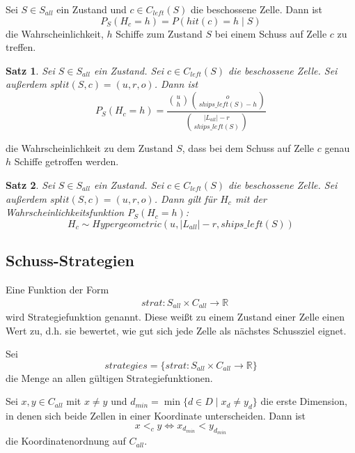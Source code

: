 \documentclass[a4paper,12pt]{llncs}
\numberwithin{equation}{section}
\newtheorem{satz}{Satz}
\begin{document}
\begin{definition}
Sei $S\in S_{all}$ ein Zustand und $c \in C_{left}(S)$ die beschossene Zelle.
Dann ist
\[
P_S(H_{c}=h)=P(hit(c)=h \mid S) 
\]
die Wahrscheinlichkeit, $h$ Schiffe zum Zustand $S$ bei einem Schuss auf Zelle $c$ zu treffen.
\end{definition}


\begin{satz}
Sei $S\in S_{all}$ ein Zustand.
Sei $c \in C_{left}(S)$ die beschossene Zelle.
Sei außerdem $split(S,c)=(u, r, o)$.
Dann ist
\[
P_S(H_c = h)=\frac{\binom{u}{h} \binom{o}{ships\_left(S) - h}}{\binom{|L_{all}| - r}{ships\_left(S)}}
\]
\end{satz}
die Wahrscheinlichkeit zu dem Zustand $S$, dass bei dem Schuss auf Zelle $c$ genau $h$ Schiffe getroffen werden.


\begin{satz}
Sei $S\in S_{all}$ ein Zustand.
Sei $c \in C_{left}(S)$ die beschossene Zelle.
Sei außerdem $split(S,c)=(u, r, o)$.
Dann gilt für $H_c$ mit der Wahrscheinlichkeitsfunktion $P_S(H_c = h)$:
\[
H_c \sim Hypergeometric(u, |L_{all}| - r, ships\_left(S))
\]
\end{satz}



\subsection{Schuss-Strategien}

\begin{definition}
Eine Funktion der Form
\begin{align}
&strat:S_{all} \times C_{all} \rightarrow \mathbb{R} \nonumber
\end{align}
wird Strategiefunktion genannt. Diese weißt zu einem Zustand einer Zelle einen Wert zu, d.h. sie bewertet, wie gut sich jede Zelle als nächstes Schussziel eignet.
\end{definition}

\begin{definition}
Sei
\[
strategies=\{ strat:S_{all} \times C_{all} \rightarrow \mathbb{R} \}
\]
die Menge an allen gültigen Strategiefunktionen.
\end{definition}

\begin{definition}
Sei $x,y \in C_{all}$ mit $x \neq y$ und $d_{min}=\min \{d \in D \mid x_d \neq y_d\}$ die erste Dimension, in denen sich beide Zellen in einer Koordinate unterscheiden.
Dann ist
\[
x <_c y \Leftrightarrow x_{d_{min}} < y_{d_{min}}
\]
die Koordinatenordnung auf $C_{all}$.
\end{definition}
\end{document}
